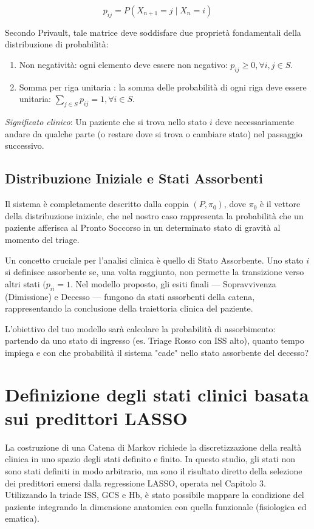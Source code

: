 \documentclass[11pt, oneside, noexaminfo]{sapthesis}   	%
\begin{document}
\begin{equation}
p_{ij} = P(X_{n+1} = j \mid X_n = i)
\end{equation}

Secondo Privault, tale matrice deve soddisfare due proprietà fondamentali della distribuzione di probabilità:
\begin{enumerate}
\item Non negatività: ogni elemento deve essere non negativo: $p_{ij} \ge 0, \forall{i, j} \in S$.
\item Somma per riga unitaria : la somma delle probabilità di ogni riga deve essere unitaria: $\sum_{j \in S} p_{ij} = 1, \forall{i} \in S$.
\end{enumerate}

\textit{Significato clinico}: Un paziente che si trova nello stato $i$ deve necessariamente andare da qualche parte (o restare dove si trova o cambiare stato) nel passaggio successivo.

\subsection{Distribuzione Iniziale e Stati Assorbenti}
Il sistema è completamente descritto dalla coppia $(P, \pi_0)$, dove $\pi_0$ è il vettore della distribuzione iniziale, che nel nostro caso rappresenta la probabilità che un paziente afferisca al Pronto Soccorso in un determinato stato di gravità al momento del triage.

Un concetto cruciale per l'analisi clinica è quello di Stato Assorbente. Uno stato $i$ si definisce assorbente se, una volta raggiunto, non permette la transizione verso altri stati $(p_{ii} = 1$.
Nel modello proposto, gli esiti finali — Sopravvivenza (Dimissione) e Decesso — fungono da stati assorbenti della catena, rappresentando la conclusione della traiettoria clinica del paziente.

L'obiettivo del tuo modello sarà calcolare la probabilità di assorbimento: partendo da uno stato di ingresso (es. Triage Rosso con ISS alto), quanto tempo impiega e con che probabilità il sistema "cade" nello stato assorbente del decesso?

\section{Definizione degli stati clinici basata sui predittori LASSO}
La costruzione di una Catena di Markov richiede la discretizzazione della realtà clinica in uno spazio degli stati definito e finito. In questo studio, gli stati non sono stati definiti in modo arbitrario, ma sono il risultato diretto della selezione dei predittori emersi dalla regressione LASSO, operata nel Capitolo 3. Utilizzando la triade ISS, GCS e Hb, è stato possibile mappare la condizione del paziente integrando la dimensione anatomica con quella funzionale (fisiologica ed ematica).
\end{document}
